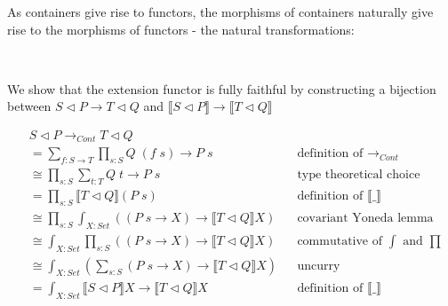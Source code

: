 {As containers give rise to functors, the morphisms of containers naturally give rise to the morphisms of functors - the natural transformations:

\begin{code}%
\>[0]\AgdaSpace{}%
\AgdaSymbol{:}\AgdaSpace{}%
\AgdaSpace{}%
\AgdaSpace{}%
\AgdaSpace{}%
\AgdaSpace{}%
\AgdaSymbol{(}\AgdaSpace{}%
\AgdaSymbol{:}\AgdaSpace{}%
\AgdaSymbol{)}\AgdaSpace{}%
\AgdaSpace{}%
\AgdaSpace{}%
\AgdaSpace{}%
\AgdaSpace{}%
\AgdaSpace{}%
\AgdaSpace{}%
\AgdaSpace{}%
\AgdaSpace{}%
\AgdaSpace{}%
\<%
\\
\>[0]\AgdaSpace{}%
\AgdaSpace{}%
\AgdaSpace{}%
\AgdaSpace{}%
\AgdaSpace{}%
\AgdaSpace{}%
\AgdaSymbol{(}\AgdaSpace{}%
\AgdaOperator{\AgdaInductiveConstructor{,}}\AgdaSpace{}%
\AgdaSymbol{)}\AgdaSpace{}%
\AgdaSymbol{=}\AgdaSpace{}%
\AgdaSpace{}%
\AgdaSpace{}%
\AgdaOperator{\AgdaInductiveConstructor{,}}\AgdaSpace{}%
\AgdaSpace{}%
\AgdaSpace{}%
\AgdaSpace{}%
\<%
\end{code}

We show that the extension functor is fully faithful by constructing a bijection between $S \triangleleft P \to T \triangleleft Q$ and $\llbracket S \triangleleft P \rrbracket \to \llbracket T \triangleleft Q \rrbracket$

\begin{align*}
& S \triangleleft P \rightarrow_{Cont} T \triangleleft Q \\
&= \sum_{f : S \to T} \prod_{s : S} Q \; (f \; s) \to P \; s && \text{definition of $\rightarrow_{Cont}$} \\
&\cong \prod_{s : S} \sum_{t : T} Q \; t \to P \; s && \text{type theoretical choice} \\
&= \prod_{s : S} \llbracket T \triangleleft Q \rrbracket (P \; s) && \text{definition of $\llbracket \_ \rrbracket$} \\
&\cong \prod_{s : S} \int_{X : Set} ((P \; s \to X) \to \llbracket T \triangleleft Q \rrbracket X) && \text{covariant Yoneda lemma} \\
&\cong \int_{X : Set} \prod_{s : S} ((P \; s \to X) \to \llbracket T \triangleleft Q \rrbracket X) && \text{commutative of $\int$ and $\prod$} \\
&\cong \int_{X : Set} (\sum_{s : S} (P \; s \to X) \to \llbracket T \triangleleft Q \rrbracket X) && \text{uncurry} \\
&= \int_{X : Set} \llbracket S \triangleleft P \rrbracket X \to \llbracket T \triangleleft Q \rrbracket X && \text{definition of $\llbracket \_ \rrbracket$} \\
\end{align*}

}
